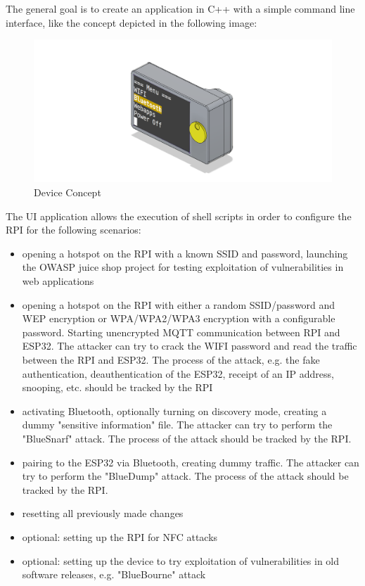 \documentclass{article}
\begin{document}
The general goal is to create an application in C++ with a simple command line interface, like the concept depicted in the following image:

\vfill

\begin{figure}[H]
    \centering
    \includegraphics[width=\columnwidth]{Concept.png}
    \caption{Device Concept}
    \label{fig:image1}
\end{figure}

The UI application allows the execution of shell scripts in order to configure the RPI for the following scenarios:

\begin{itemize}
	\item opening a hotspot on the RPI with a known SSID and password, launching the OWASP juice shop project for testing exploitation of vulnerabilities in web applications 
	\item opening a hotspot on the RPI with either a random SSID/password and WEP encryption or WPA/WPA2/WPA3 encryption with a configurable password. 
    Starting unencrypted MQTT communication between RPI and ESP32. 
    The attacker can try to crack the WIFI password and read the traffic between the RPI and ESP32. 
    The process of the attack, e.g. the fake authentication, deauthentication of the ESP32, receipt of an IP address, snooping, etc. should be tracked by the RPI 
    \item activating Bluetooth, optionally turning on discovery mode, creating a dummy "sensitive information" file. The attacker can try to perform the "BlueSnarf" attack. 
    The process of the attack should be tracked by the RPI.
	\item pairing to the ESP32 via Bluetooth, creating dummy traffic. The attacker can try to perform the "BlueDump" attack.
    The process of the attack should be tracked by the RPI.
	\item resetting all previously made changes
	\item optional: setting up the RPI for NFC attacks
	\item optional: setting up the device to try exploitation of vulnerabilities in old software releases, e.g. "BlueBourne" attack 
\end{itemize}
\end{document}
